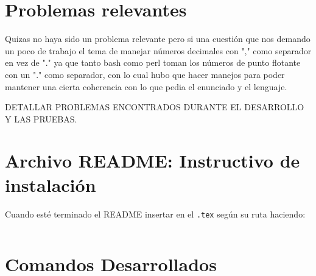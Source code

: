 \documentclass[12pt]{article}
\begin{document}
\section{Problemas relevantes}

Quizas no haya sido un problema relevante pero si una cuestión que nos demando un poco de trabajo el tema de manejar números decimales con "," como separador en vez de "." ya que tanto bash como perl toman los números de punto flotante con un "." como separador, con lo cual hubo que hacer manejos para poder mantener una cierta coherencia con lo que pedia el enunciado y el lenguaje.

DETALLAR PROBLEMAS ENCONTRADOS DURANTE EL DESARROLLO Y LAS PRUEBAS.



\section{Archivo README: Instructivo de instalación}
Cuando esté terminado el README insertar en el \verb|.tex| según su ruta haciendo:
\begin{verbatim}

\end{verbatim}

\section{Comandos Desarrollados}
\end{document}
